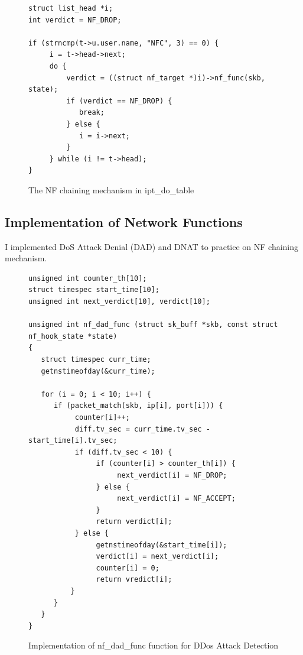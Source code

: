 \begin{figure}
	\begin{center}
		\begin{screen}
			\begin{verbatim}
struct list_head *i;
int verdict = NF_DROP;

if (strncmp(t->u.user.name, "NFC", 3) == 0) {
     i = t->head->next;
     do {
         verdict = ((struct nf_target *)i)->nf_func(skb, state);
         if (verdict == NF_DROP) {
            break;
         } else {
            i = i->next;
         }
     } while (i != t->head);
}
			\end{verbatim}	
		\end{screen}
	\end{center}
	\caption{The NF chaining mechanism in ipt\_do\_table}
	\label{fig: nf_chaining_code}	
\end{figure}

\subsection{Implementation of Network Functions}
I implemented DoS Attack Denial (DAD) and DNAT to practice on NF chaining mechanism.

\begin{figure}
	\begin{center}
		\begin{screen}
			\begin{verbatim}
unsigned int counter_th[10];
struct timespec start_time[10];
unsigned int next_verdict[10], verdict[10];

unsigned int nf_dad_func (struct sk_buff *skb, const struct nf_hook_state *state) 
{
   struct timespec curr_time;
   getnstimeofday(&curr_time);

   for (i = 0; i < 10; i++) {
      if (packet_match(skb, ip[i], port[i])) {
           counter[i]++;
           diff.tv_sec = curr_time.tv_sec - start_time[i].tv_sec;
           if (diff.tv_sec < 10) {
                if (counter[i] > counter_th[i]) {
                     next_verdict[i] = NF_DROP;
                } else {
                     next_verdict[i] = NF_ACCEPT;
                }
                return verdict[i];
           } else {
                getnstimeofday(&start_time[i]);
                verdict[i] = next_verdict[i];
                counter[i] = 0;
                return vredict[i];
          }
      }
   }
}
			\end{verbatim}	
		\end{screen}
	\end{center}
	\caption{Implementation of nf\_dad\_func function for DDos Attack Detection}
	\label{fig: nf_dad_func}
\end{figure}

